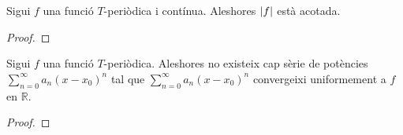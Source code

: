 \documentclass[../Apunts.tex]{subfiles}
\begin{document}
	\begin{lemma}
		\label{lema:les funciones periòdiques i contínues estàn acotades}
		Sigui \(f\) una funció \(T\)-periòdica i contínua. Aleshores \(\abs{f}\) està acotada.
		\begin{proof}
		\end{proof}
	\end{lemma}
	\begin{lemma}
		\label{lema:les funcions periòdiques no poden ser aproximades per una sèrie de potències}
		Sigui \(f\) una funció \(T\)-periòdica. Aleshores no existeix cap sèrie de potències \(\sum_{n=0}^{\infty}a_{n}(x-x_{0})^{n}\) tal que \(\sum_{n=0}^{\infty}a_{n}(x-x_{0})^{n}\) convergeixi uniformement a \(f\) en \(\mathbb{R}\).
		\begin{proof}
		\end{proof}
	\end{lemma}
\end{document}
